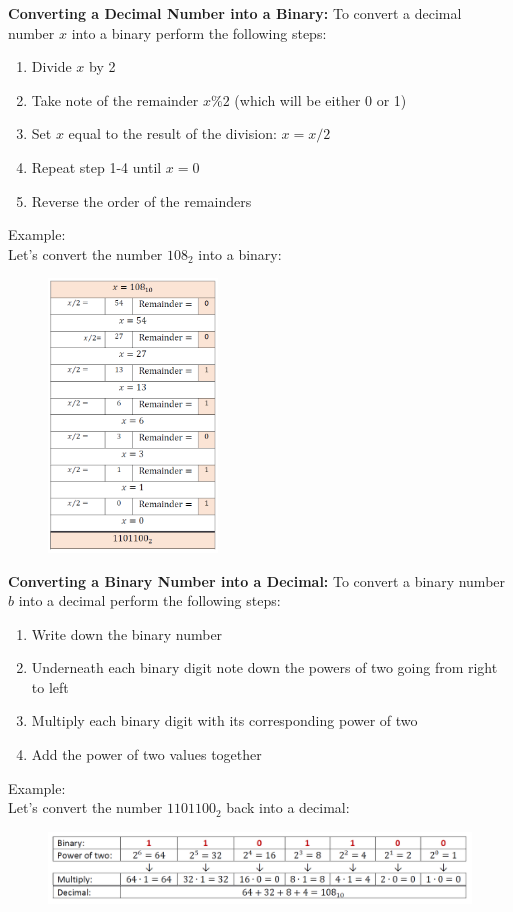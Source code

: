 \textbf{Converting a Decimal Number into a Binary:}
To convert a decimal number $x$ into a binary perform the following steps:
\begin{enumerate}
	\item Divide $x$ by 2
	\item Take note of the remainder $x\%2$ (which will be either 0 or 1)
	\item Set $x$ equal to the result of the division: $x = x/2$
	\item Repeat step 1-4 until $x = 0$
	\item Reverse the order of the remainders
\end{enumerate}
Example:\\
Let’s convert the number $108_2$ into a binary:
\begin{figure}[H]
		\centering
		\includegraphics[width=0.4\textwidth]{../IMG/8H02_1.png} 
\end{figure}

\textbf{Converting a Binary Number into a Decimal:}
To convert a binary number $b$ into a decimal perform the following steps:
\begin{enumerate}
	\item Write down the binary number
	\item Underneath each binary digit note down the powers of two going from right to left
	\item Multiply each binary digit with its corresponding power of two
	\item Add the power of two values together
\end{enumerate}
Example:\\
Let’s convert the number $1101100_2$ back into a decimal:
\begin{figure}[H]
		\centering
		\includegraphics[width=\textwidth]{../IMG/8H02_2.png} 
\end{figure}

